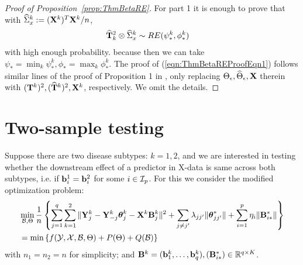 \documentclass[12pt, letterpaper]{article}
\numberwithin{equation}{section}
\begin{document}
\begin{proof}[Proof of Proposition~\ref{prop:ThmBetaRE}]
For part 1 it is enough to prove that with $ \widehat \Sigma_x^k := ({\mathbf{X}}^k)^T {\mathbf{X}}^k/n$,
%
\begin{align}\label{eqn:ThmBetaREProofEqn1}
\widehat {{\mathbf{T}}}_k^2 \otimes \widehat \Sigma_x^k & \sim RE (\psi_*^k, \phi_*^k)
\end{align}
%
with high enough probability. because then we can take $\psi_* = \min_k \psi_*^k, \phi_* = \max_k \phi_*^k$. The proof of (\ref{eqn:ThmBetaREProofEqn1}) follows similar lines of the proof of Proposition 1 in \cite{LinEtal16}, only replacing $\Theta_\epsilon, \widehat \Theta_\epsilon, {\mathbf{X}}$ therein with $({\mathbf{T}}^k)^2, (\widehat {{\mathbf{T}}}^k)^2, {\mathbf{X}}^k$, respectively. We omit the details.%
%

\end{proof}

\hrulefill

\section{Two-sample testing}
Suppose there are two disease subtypes: $k = 1,2$, and we are interested in testing whether the downstream effect of a predictor in X-data is same across both subtypes, i.e. if ${\bf{b}}_i^1 = {\bf{b}}_i^2$ for some $i \in {\cal{I}}_p$. For this we consider the modified optimization problem:
%
\begin{align}
& \min_{{\cal{B}}, \Theta} \frac{1}{n} \left\{ \sum_{j=1}^q \sum_{k=1}^2 \| {\mathbf{Y}}_j^k - {\mathbf{Y}}_{-j}^k {\boldsymbol{\theta}}_j^k - {\mathbf{X}}^k {\mathbf{B}}_{j}^k \|^2 + \sum_{j \neq j'} \lambda_{jj'} \| {\boldsymbol{\theta}}_{jj'}^* \| + \sum_{i=1}^p \eta_i \| {\mathbf{B}}_{i*}^* \| \right\} \notag\\
&= \min \left\{ f ( {\cal{Y}}, {\cal{X}}, {\cal{B}}, \Theta) + P (\Theta) + Q ({\cal{B}}) \right\} 
\end{align}
%
with $n_1 = n_2 = n$ for simplicity; and ${\mathbf{B}}^k = ({\bf{b}}_1^k, \ldots, {\bf{b}}_q^k), ({\mathbf{B}}_{i*}^*) \in {\mathbb{R}}^{ q \times K}$.
\end{document}
